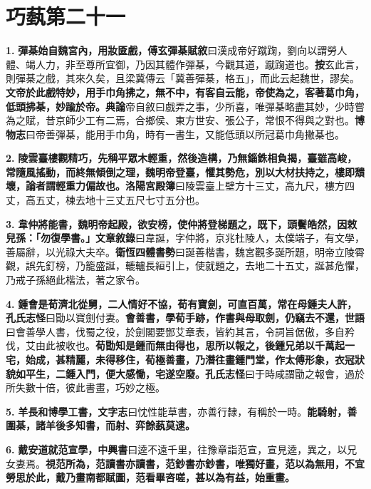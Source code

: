 \chapter{巧蓺第二十一}

\textbf{1.} \textbf{彈棊始自魏宮內，用妝匳戲，}{\footnotesize \textbf{傅玄彈棊賦敘}曰漢成帝好蹴踘，劉向以謂勞人體、竭人力，非至尊所宜御，乃因其體作彈棊，今觀其道，蹴踘道也。\textbf{按}玄此言，則彈棊之戲，其來久矣，且梁冀傳云「冀善彈棊，格五」，而此云起魏世，謬矣。}\textbf{文帝於此戲特妙，用手巾角拂之，無不中，有客自云能，帝使為之，客著葛巾角，低頭拂棊，妙踰於帝。}{\footnotesize \textbf{典論}帝自敘曰戲弄之事，少所喜，唯彈棊略盡其妙，少時嘗為之賦，昔京師少工有二焉，合鄉侯、東方世安、張公子，常恨不得與之對也。\textbf{博物志}曰帝善彈棊，能用手巾角，時有一書生，又能低頭以所冠葛巾角撇棊也。}

\textbf{2.} \textbf{陵雲臺樓觀精巧，先稱平眾木輕重，然後造構，乃無錙銖相負揭，臺雖高峻，常隨風搖動，而終無傾倒之理，魏明帝登臺，懼其勢危，別以大材扶持之，樓即穨壞，論者謂輕重力偏故也。}{\footnotesize \textbf{洛陽宮殿簿}曰陵雲臺上壁方十三丈，高九尺，樓方四丈，高五丈，棟去地十三丈五尺七寸五分也。}

\textbf{3.} \textbf{韋仲將能書，魏明帝起殿，欲安榜，使仲將登梯題之，既下，頭鬢皓然，因敕兒孫：「勿復學書。」}{\footnotesize \textbf{文章敘錄}曰韋誕，字仲將，京兆杜陵人，太僕端子，有文學，善屬辭，以光祿大夫卒。\textbf{衛恆四體書勢}曰誕善楷書，魏宮觀多誕所題，明帝立陵霄觀，誤先釘榜，乃籠盛誕，轆轤長絙引上，使就題之，去地二十五丈，誕甚危懼，乃戒子孫絕此楷法，著之家令。}

\textbf{4.} \textbf{鍾會是荀濟北從舅，二人情好不協，荀有寶劍，可直百萬，常在母鍾夫人許，}{\footnotesize \textbf{孔氏志怪}曰勖以寶劍付妻。}\textbf{會善書，學荀手跡，作書與母取劍，仍竊去不還，}{\footnotesize \textbf{世語}曰會善學人書，伐蜀之役，於劍閣要鄧艾章表，皆約其言，令詞旨倨傲，多自矜伐，艾由此被收也。}\textbf{荀勖知是鍾而無由得也，思所以報之，後鍾兄弟以千萬起一宅，始成，甚精麗，未得移住，荀極善畫，乃潛往畫鍾門堂，作太傅形象，衣冠狀貌如平生，二鍾入門，便大感慟，宅遂空廢。}{\footnotesize \textbf{孔氏志怪}曰于時咸謂勖之報會，過於所失數十倍，彼此書畫，巧妙之極。}

\textbf{5.} \textbf{羊長和博學工書，}{\footnotesize \textbf{文字志}曰忱性能草書，亦善行隸，有稱於一時。}\textbf{能騎射，善圍棊，諸羊後多知書，而射、弈餘蓺莫逮。}

\textbf{6.} \textbf{戴安道就范宣學，}{\footnotesize \textbf{中興書}曰逵不遠千里，往豫章詣范宣，宣見逵，異之，以兄女妻焉。}\textbf{視范所為，范讀書亦讀書，范鈔書亦鈔書，唯獨好畫，范以為無用，不宜勞思於此，戴乃畫南都賦圖，范看畢咨嗟，甚以為有益，始重畫。}

